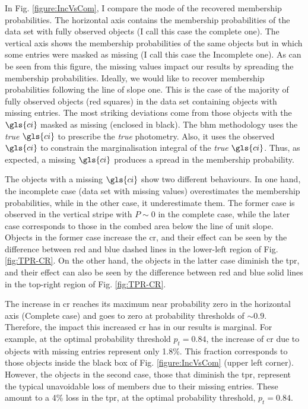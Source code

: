 In Fig. \ref{figure:IncVsCom}, I compare the mode of the recovered membership probabilities. The horizontal axis contains the membership probabilities of the data set with fully observed objects (I call this case the complete one). The vertical axis shows the membership probabilities of the same objects but in which some entries were masked as missing (I call this case the Incomplete one). As can be seen from this figure, the missing values impact our results by spreading the membership probabilities. Ideally, we would like to recover membership probabilities following the line of slope one. This is the case of the majority of fully observed objects (red squares) in the data set containing objects with missing entries. The most striking deviations come from those objects with the $\gls{ci}$ masked as missing (enclosed in black). The \gls{bhm} methodology uses the \emph{true} $\gls{ci}$ to prescribe the \emph{true} photometry. Also, it uses the observed $\gls{ci}$ to constrain the marginalisation integral of the \emph{true} $\gls{ci}$. Thus, as expected, a missing $\gls{ci}$ produces a spread in the membership probability.

The objects with a missing $\gls{ci}$ show two different behaviours. In one hand, the incomplete case (data set with missing values) overestimates the membership probabilities, while in the other case, it underestimate them. The former case is observed in the vertical stripe with $P \sim 0$ in the complete case, while the later case corresponds to those in the combed area below the line of unit slope.  Objects in the former case increase the \gls{cr}, and their effect can be seen by the difference between red and blue dashed lines in the lower-left region of Fig. \ref{fig:TPR-CR}. On the other hand, the objects in the latter case diminish the \gls{tpr}, and their effect can also be seen by the difference between red and blue solid lines in the top-right region of Fig. \ref{fig:TPR-CR}. 

The increase in \gls{cr} reaches its maximum near probability zero in the horizontal axis (Complete case) and goes to zero at probability thresholds of $\sim 0.9$. Therefore, the impact this increased \gls{cr} has in our results is marginal. For example, at the optimal probability threshold $p_t=0.84$, the increase of \gls{cr} due to objects with missing entries represent only 1.8\%. This fraction corresponds to those objects inside the black box of Fig. \ref{figure:IncVsCom} (upper left corner). However, the objects in the second case, those that diminish the \gls{tpr}, represent the typical unavoidable loss of members due to their missing entries. These amount to a 4\% loss in the \gls{tpr}, at the optimal probability threshold, $p_t=0.84$.


